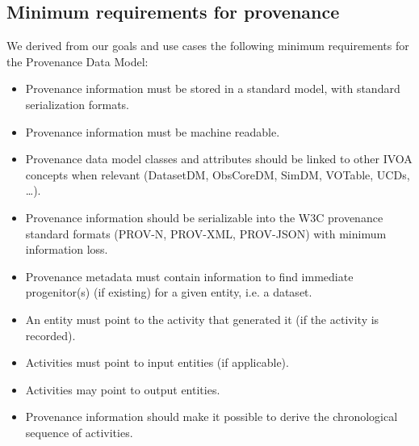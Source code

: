 \subsection{Minimum requirements for provenance}\label{sec:requirements}

We derived from our goals and use cases the following minimum requirements for the Provenance Data Model:

\begin{itemize}


\item Provenance information must be stored in a standard model, with standard serialization formats.

\item Provenance information must be machine readable.

\item Provenance data model classes and attributes should be linked to other IVOA concepts when relevant (DatasetDM, ObsCoreDM, SimDM, VOTable, UCDs, \ldots).

\item Provenance information should be serializable into the W3C provenance standard formats (PROV-N, PROV-XML, PROV-JSON) with minimum information loss.



\item Provenance metadata must contain information to find immediate progenitor(s) (if existing) for a given entity, i.e. a dataset.


\item An entity must point to the activity that generated it (if the activity is recorded).

\item Activities must point to input entities (if applicable).

\item Activities may point to output entities.

\item Provenance information should make it possible to derive the chronological sequence of activities.

\end{itemize}

